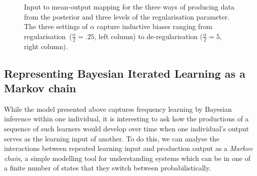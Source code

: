 \begin{figure}[htbp]

{\centering {}

}

\caption[Input to mean-output mapping for the three ways of producing data from the posterior and three levels of the regularisation parameter]{Input to mean-output mapping for the three ways of producing data from the posterior and three levels of the regularisation parameter. The three settings of $\alpha$ capture inductive biases ranging from regularisation~($\frac{\alpha}{2}=.25$, left column) to de-regularisation ($\frac{\alpha}{2}=5$, right column).}\label{fig:meanmapping}
\end{figure}




\subsection{Representing Bayesian Iterated Learning as a Markov chain}
\label{sec:markovmodel}

While the model presented above captures frequency learning by Bayesian inference within one individual, it is interesting to ask how the productions of a sequence of such learners would develop over time when one individual's output serves as the learning input of another. To do this, we can analyse the interactions between repeated learning input and production output as a \emph{Markov chain}, a simple modelling tool for understanding systems which can be in one of a finite number of states that they switch between probabilistically.

